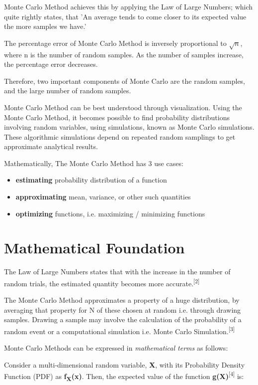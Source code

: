 \documentclass{resonance}
\begin{document}
	Monte Carlo Method achieves this by applying the Law of Large Numbers; which quite rightly states, that 'An average tends to come closer to its expected value the more samples we have.'
	
	The percentage error of Monte Carlo Method is inversely proportional to $\sqrt{n}$, where n is the number of random samples. As the number of samples increase, the percentage error decreases.
	
	Therefore, two important components of Monte Carlo are the random samples, and the large number of random samples.
	
	Monte Carlo Method can be best understood through visualization. Using the Monte Carlo Method, it becomes possible to find probability distributions involving random variables, using simulations, known as Monte Carlo simulations. These algorithmic simulations depend on repeated random samplings to get approximate analytical results.
	
	Mathematically, The Monte Carlo Method has 3 use cases:
	\begin{itemize}
		\item \textbf{estimating} probability distribution of a function
		\item \textbf{approximating} mean, variance, or other such quantities
		\item \textbf{optimizing} functions, i.e. maximizing / minimizing functions
	\end{itemize}
	
	\section{Mathematical Foundation}
	The Law of Large Numbers states that with the increase in the number of random trials, the estimated quantity becomes more accurate.\textsuperscript{[2]}
	
	The Monte Carlo Method approximates a property of a huge distribution, by averaging that property for N of these chosen at random i.e. through drawing samples. Drawing a sample may involve the calculation of the probability of a random event or a computational simulation i.e. Monte Carlo Simulation.\textsuperscript{[3]}
	
	Monte Carlo Methods can be expressed in \textit{mathematical terms} as follows:
	
	Consider a multi-dimensional random variable, \textbf{X}, with its Probability Density Function (PDF) as \textbf{f\textsubscript{X}(x)}. Then, the expected value of the function \textbf{g(X)}\textsuperscript{[4]} is:
	
\end{document}

